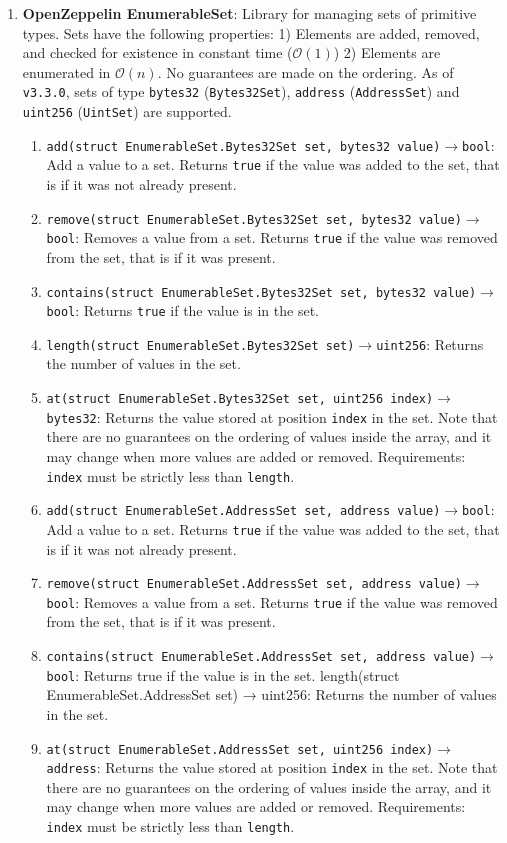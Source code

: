 \begin{enumerate}
\item\textbf{OpenZeppelin EnumerableSet}: Library for managing sets of primitive types. Sets have the following properties: 1) Elements are added, removed, and checked for existence in constant time ($\mathcal{O}(1)$) 2) Elements are enumerated in $\mathcal{O}(n)$. No guarantees are made on the ordering. As of \verb|v3.3.0|, sets of type \verb|bytes32| (\verb|Bytes32Set|), \verb|address| (\verb|AddressSet|) and \verb|uint256| (\verb|UintSet|) are supported.
	\begin{enumerate}
	\item\verb|add(struct EnumerableSet.Bytes32Set set, bytes32 value)|$\rightarrow$\verb|bool|: Add a value to a set. Returns \verb|true| if the value was added to the set, that is if it was not already present.
	\item\verb|remove(struct EnumerableSet.Bytes32Set set, bytes32 value)|$\rightarrow$\verb|bool|: Removes a value from a set. Returns \verb|true| if the value was removed from the set, that is if it was present.
	\item\verb|contains(struct EnumerableSet.Bytes32Set set, bytes32 value)|$\rightarrow$\verb|bool|: Returns \verb|true| if the value is in the set.
	\item\verb|length(struct EnumerableSet.Bytes32Set set)|$\rightarrow$\verb|uint256|: Returns the number of values in the set.
	\item\verb|at(struct EnumerableSet.Bytes32Set set, uint256 index)|$\rightarrow$\verb|bytes32|: Returns the value stored at position \verb|index| in the set. Note that there are no guarantees on the ordering of values inside the array, and it may change when more values are added or removed. Requirements: \verb|index| must be strictly less than \verb|length|.
	\item\verb|add(struct EnumerableSet.AddressSet set, address value)|$\rightarrow$\verb|bool|: Add a value to a set. Returns \verb|true| if the value was added to the set, that is if it was not already present.
	\item\verb|remove(struct EnumerableSet.AddressSet set, address value)|$\rightarrow$\verb|bool|: Removes a value from a set. Returns \verb|true| if the value was removed from the set, that is if it was present.
	\item\verb|contains(struct EnumerableSet.AddressSet set, address value)|$\rightarrow$\verb|bool|: Returns true if the value is in the set. length(struct EnumerableSet.AddressSet set) → uint256: Returns the number of values in the set.
	\item\verb|at(struct EnumerableSet.AddressSet set, uint256 index)|$\rightarrow$\verb|address|: Returns the value stored at position \verb|index| in the set. Note that there are no guarantees on the ordering of values inside the array, and it may change when more values are added or removed. Requirements: \verb|index| must be strictly less than \verb|length|.

\end{enumerate}
\end{enumerate}
